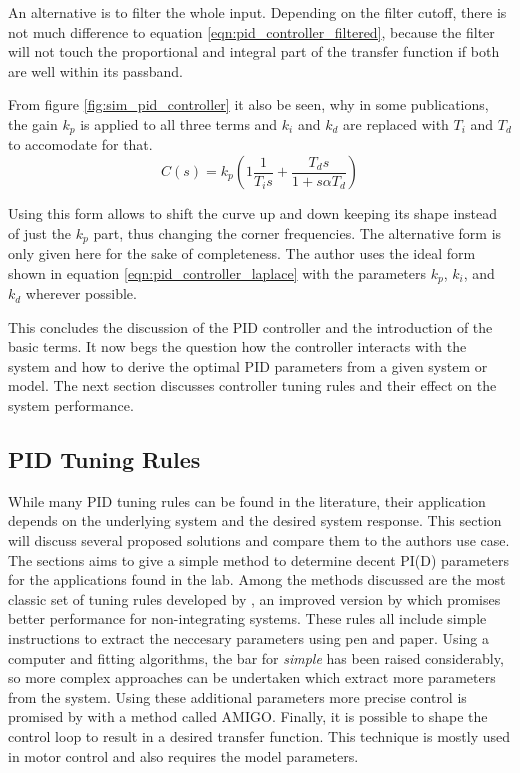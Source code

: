 An alternative is to filter the whole input. Depending on the filter cutoff, there is not much difference to equation \ref{eqn:pid_controller_filtered}, because the filter will not touch the proportional and integral part of the transfer function if both are well within its passband.

From figure \ref{fig:sim_pid_controller} it also be seen, why in some publications, the gain $k_p$ is applied to all three terms and $k_i$ and $k_d$ are replaced with $T_i$ and $T_d$ to accomodate for that.
\begin{equation}
    C(s) = k_p \left(1 \frac{1}{T_i s} + \frac{T_d s}{1 + s \alpha T_d} \right) \label{eqn:pid_controller_series}
\end{equation}

Using this form allows to shift the curve up and down keeping its shape instead of just the $k_p$ part, thus changing the corner frequencies. The alternative form is only given here for the sake of completeness. The author uses the ideal form shown in equation \ref{eqn:pid_controller_laplace} with the parameters $k_p$, $k_i$, and $k_d$ wherever possible.

This concludes the discussion of the PID controller and the introduction of the basic terms. It now begs the question how the controller interacts with the system and how to derive the optimal PID parameters from a given system or model. The next section discusses controller tuning rules and their effect on the system performance.

\clearpage
\subsection{PID Tuning Rules}%
\label{sec:pid_tuning_rules}
While many PID tuning rules can be found in the literature, their application depends on the underlying system and the desired system response. This section will discuss several proposed solutions and compare them to the authors use case. The sections aims to give a simple method to determine decent PI(D) parameters for the applications found in the lab. Among the methods discussed are the most classic set of tuning rules developed by \citeauthor{ziegler_nichols} \cite{ziegler_nichols}, an improved version by \citeauthor{simc_paper} \cite{simc_paper} which promises better performance for non-integrating systems. These rules all include simple instructions to extract the neccesary parameters using pen and paper. Using a computer and fitting algorithms, the bar for \textit{simple} has been raised considerably, so more complex approaches can be undertaken which extract more parameters from the system. Using these additional parameters more precise control is promised by \citeauthor{pid_basics} \cite{pid_basics, advanced_pid_control} with a method called AMIGO. Finally, it is possible to shape the control loop to result in a desired transfer function. This technique is mostly used in motor control \cite{pid_controller,advanced_pid_control} and also requires the model parameters.

